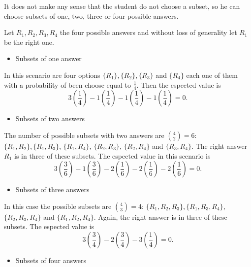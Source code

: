 \documentclass[12pt]{article}
\begin{document}
	It does not make any sense that the student do not choose a subset, so he can choose subsets of one, two, three or four possible answers.
	
	Let $R_1, R_2, R_3, R_4$ the four possible answers and without loss of generality let $R_1$ be the right one.
	
	\begin{itemize}
		\item Subsets of one answer
	\end{itemize}
	
	In this scenario are four options $\{R_1\}, \{R_2\}, \{R_3\}$ and $\{R_4\}$ each one of them with a probability of been choose equal to $\frac{1}{4}$. Then the espected value is
	\begin{equation*}
	3 \left( \frac{1}{4} \right) - 1 \left( \frac{1}{4}\right) - 1 \left(\frac{1}{4}\right) - 1 \left( \frac{1}{4}\right) = 0.
	\end{equation*}  
	
	\begin{itemize}
		\item Subsets of two answers
	\end{itemize}
	
	The number of possible subsets with two answers are $\binom{4}{2} = 6$: $\{R_1, R_2\}, \{R_1, R_3\}$, $\{R_1, R_4\}$, $\{R_2, R_3\}$, $\{R_2, R_4\}$ and $\{R_3, R_4\}$. The right answer $R_1$ is in three of these subsets. The espected value in this scenario is
	\begin{equation*}
	3 \left(\frac{3}{6}\right) - 1 \left(\frac{3}{6}\right) - 2 \left(\frac{1}{6}\right) - 2 \left(\frac{1}{6}\right) - 2 \left(\frac{1}{6}\right) = 0.
	\end{equation*}
	
	\begin{itemize}
		\item Subsets of three answers
	\end{itemize}
	In this case the possible subsets are $\binom{4}{3} = 4$: $\{R_1, R_2, R_3\}, \{R_1, R_3, R_4\}$, $\{R_2, R_3, R_4\}$ and $\{R_1, R_2, R_4\}$. Again, the right answer is in three of these subsets. The espected value is
	\begin{equation*}
	3 \left(\frac{3}{4}\right) - 2 \left(\frac{3}{4}\right) - 3 \left(\frac{1}{4}\right) = 0.
	\end{equation*} 
	
	\begin{itemize}
		\item Subsets of four answers
	\end{itemize}
	
\end{document}
